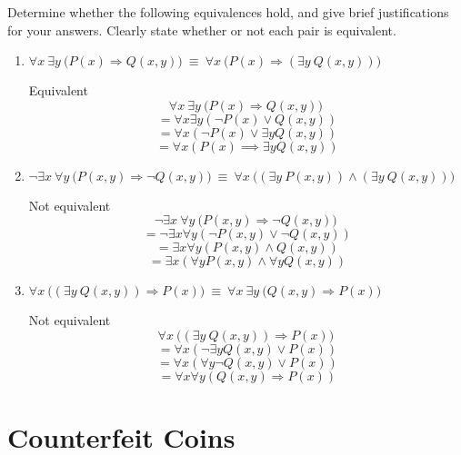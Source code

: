 \documentclass[11pt]{article}
\newcommand*{\Question}[1]{\vfill\pagebreak[3]\section{#1}}
\newenvironment{Parts}{\begin{enumerate}[label=(\alph*)]}{\end{enumerate}}
\newcommand*{\Part}{\item}
\newenvironment{Answer}{\vspace{20pt}}{\vspace{20pt}}
\begin{document}
Determine whether the following equivalences hold, and give brief justifications for your answers. Clearly state whether or not each pair is equivalent.
\begin{Parts}

\Part $\forall x~\exists y~\big(P(x)\Rightarrow Q(x,y)\big)~\equiv~\forall x~\big(P(x)\Rightarrow(\exists y~Q(x,y))\big)$

\begin{Answer}
Equivalent
$$\forall x~\exists y~\big(P(x)\Rightarrow Q(x,y)\big)~$$
$$=\forall x \exists y (\neg P(x) \lor Q(x,y))$$
$$=\forall x (\neg P(x) \lor \exists y Q(x,y))$$
$$=\forall x (P(x) \implies \exists y Q(x,y))$$
\end{Answer}

\Part $\neg\exists x~\forall y~\big(P(x,y)\Rightarrow\neg Q(x,y)\big)~\equiv~\forall x~\big( (\exists y~P(x,y)) \land (\exists y~Q(x,y)) \big)$

\begin{Answer}
Not equivalent
$$\neg\exists x~\forall y~\big(P(x,y)\Rightarrow\neg Q(x,y)\big)~$$
$$=\neg \exists x \forall y (\neg P(x,y) \lor \neg Q(x,y))$$
$$=\exists x \forall y (P(x,y) \land Q(x,y))$$
$$=\exists x (\forall y P(x,y) \land \forall y Q(x,y))$$
\end{Answer}

\Part $\forall x~\big((\exists y~Q(x,y))\Rightarrow P(x)\big)~\equiv~\forall x~\exists y~\big(Q(x,y)\Rightarrow P(x)\big)$

\begin{Answer}
Not equivalent
$$\forall x~\big((\exists y~Q(x,y))\Rightarrow P(x)\big)~$$
$$=\forall x (\neg \exists y Q(x,y) \lor P(x))$$
$$=\forall x (\forall y \neg Q(x,y) \lor P(x))$$
$$=\forall x \forall y (Q(x,y) \Rightarrow P(x))$$
\end{Answer}

\end{Parts}


\Question{Counterfeit Coins}
\end{document}
